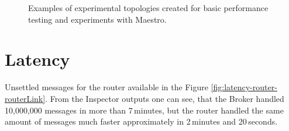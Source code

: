 \begin{figure}[H]
	\centering
	\begin{minipage}{0.49\linewidth}
	\end{minipage}
	\begin{minipage}{0.49\linewidth}
	\end{minipage}
	\caption[Examples of experimental topologies created for basic performance testing and experiments with Maestro.]{Examples of experimental topologies created for basic performance testing and experiments with Maestro.}
  \label{fig:routerLink-throughput}
\end{figure}

\section*{Latency}

Unsettled messages for the router available in the Figure \ref{fig:latency-router-routerLink}. From the Inspector outputs one can see, that the Broker handled 10,000,000 messages in more than 7\,minutes, but the router handled the same amount of messages much faster approximately in 2\,minutes and 20\,seconds.

